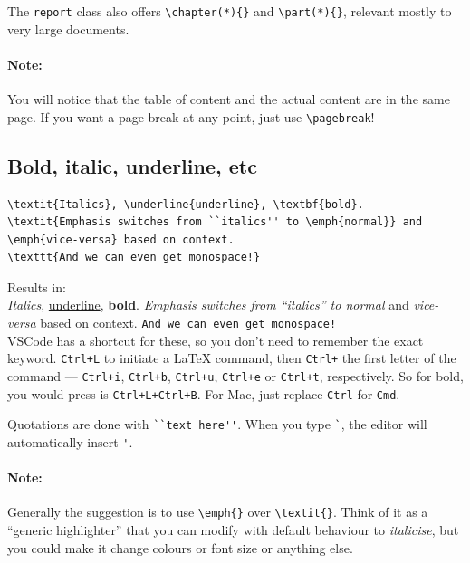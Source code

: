 The \verb|report| class also offers \verb|\chapter(*){}| and \verb|\part(*){}|, relevant mostly to very large documents.

\paragraph{Note:} You will notice that the table of content and the actual content are in the same page. If you want a page break at any point, just use \verb|\pagebreak|!

\subsection{Bold, italic, underline, etc}

\begin{lstlisting}
\textit{Italics}, \underline{underline}, \textbf{bold}.
\textit{Emphasis switches from ``italics'' to \emph{normal}} and \emph{vice-versa} based on context.
\texttt{And we can even get monospace!}
\end{lstlisting}
Results in: \\
\textit{Italics}, \underline{underline}, \textbf{bold}.
\textit{Emphasis switches from ``italics'' to \emph{normal}} and \emph{vice-versa} based on context.
\texttt{And we can even get monospace!}\\

VSCode has a shortcut for these, so you don't need to remember the exact keyword. \verb|Ctrl+L| to initiate a LaTeX command, then \verb|Ctrl+| the first letter of the command --- \verb|Ctrl+i|, \verb|Ctrl+b|, \verb|Ctrl+u|, \verb|Ctrl+e| or \verb|Ctrl+t|, respectively.
So for bold, you would press is \verb|Ctrl+L+Ctrl+B|.
For Mac, just replace \verb|Ctrl| for \verb|Cmd|.

Quotations are done with \verb|``text here''|.
When you type \verb|`|, the editor will automatically insert \verb|'|.

\paragraph{Note:} Generally the suggestion is to use \verb|\emph{}| over \verb|\textit{}|. Think of it as a ``generic highlighter'' that you can modify with default behaviour to \emph{italicise}, but you could make it change colours or font size or anything else.